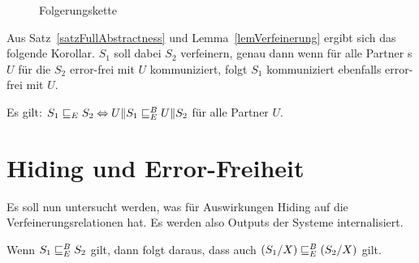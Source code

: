 \begin{figure}[h!tbp]
  \begin{center}
    \caption{Folgerungskette}
    \label{Folgerungskette}
  \end{center}
\end{figure}

Aus Satz~\ref{satzFullAbstractness} und Lemma~\ref{lemVerfeinerung} ergibt sich
das folgende Korollar. $S_1$ soll dabei $S_2$ verfeinern, genau dann wenn für
alle Partner \EIO{}s $U$ für die $S_2$ error-frei mit $U$ kommuniziert, folgt
$S_1$ kommuniziert ebenfalls error-frei mit $U$.

\begin{kor}
  Es gilt: $S_1\sqsubseteq _E S_2 \Leftrightarrow U\|S_1\sqsubseteq _E^B U\|S_2$ für alle Partner
  $U$.
\end{kor}

\section{Hiding und Error-Freiheit}

Es soll nun untersucht werden, was für Auswirkungen Hiding auf die
Verfeinerungsrelationen hat. Es werden also Outputs der Systeme internalisiert.

\begin{prop}
  \label{propErBaIn}
  Wenn $S_1\sqsubseteq _E^B S_2$ gilt, dann folgt daraus, dass auch $(S_1/X)\sqsubseteq _E^B
  (S_2/X)$ gilt.
\end{prop}

